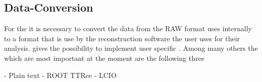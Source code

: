 \subsection{Data-Conversion}
For the \offlineana it is necessary to convert the data from the RAW format \eudaq uses internally to a format that is use by the reconstruction software the user uses for their analysis. 
\eudaq gives the possibility to implement user specific \filewriter. 
Among many others the \filewriter which are most important at the moment are the following three 

- Plain text
- ROOT TTRee 
- LCIO 





